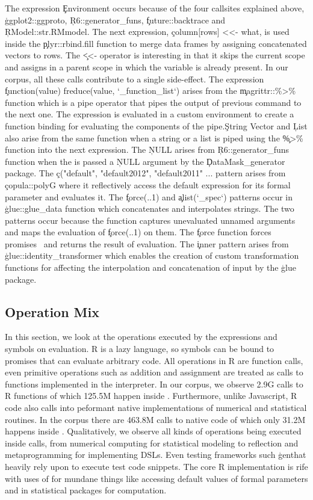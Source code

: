 \documentclass[conference]{IEEEtran}
\begin{document}
The expression \c{Environment} occurs because of the four callsites explained
above, \c{ggplot2::ggproto}, \c{R6::generator_funs}, \c{future::backtrace} and
\c{RModel::str.RMmodel}. The next expression, \c{column[rows] <<- what}, is used
inside the \c{plyr::rbind.fill} function to merge data frames by assigning
concatenated vectors to rows. The \c{<<-} operator is interesting in that it
skips the current scope and assigns in a parent scope in which the variable is
already present. In our corpus, all these \eval calls contribute to a single
side-effect. The expression \c{function(value) freduce(value, `_function_list`)}
arises from the \c{magrittr::\%>\%} function which is a pipe operator that pipes
the output of previous command to the next one. The expression is evaluated in a
custom environment to create a function binding for evaluating the components of
the pipe.\c{String Vector} and \c{List} also arise from the same function when a
string or a list is piped using the \c{\%>\%} function into the next expression.
The \c{NULL} arises from \c{R6::generator_funs} function when the \eval is
passed a \c{NULL} argument by the \c{DataMask_generator} package. The
\c{c("default", "default2012", "default2011" ...} pattern arises from
\c{copula::polyG} where it reflectively access the default expression for its
formal parameter and evaluates it. The \c{force(..1)} and \c{alist(`_spec`)}
patterns occur in \c{glue::glue_data} function which concatenates and
interpolates strings. The two patterns occur because the function captures
unevaluated unnamed arguments and maps the evaluation of \c{force(..1)} on them.
The \c{force} function forces promises~\cite{oopsla19a} and returns the result
of evaluation. The \c{inner} pattern arises from \c{glue::identity_transformer}
which enables the creation of custom transformation functions for affecting the
interpolation and concatenation of input by the \c{glue} package.

\subsection{Operation Mix}
In this section, we look at the operations executed by the expressions and
symbols on evaluation. R is a lazy language, so symbols can be bound to promises
that can evaluate arbitrary code. All operations in R are function calls, even
primitive operations such as addition and assignment are treated as calls to
functions implemented in the interpreter. In our corpus, we observe 2.9G calls
to R functions of which 125.5M happen inside \eval. Furthermore, unlike
Javascript, R code also calls into peformant native implementations of numerical
and statistical routines. In the corpus there are 463.8M calls to native code of
which only 31.2M happens inside \eval.
Qualitatively, we observe all kinds of operations being executed inside \eval
calls, from numerical computing for statistical modeling to reflection and
metaprogramming for implementing DSLs. Even testing frameworks such \c{genthat}
heavily rely upon \eval to execute test code snippets. The core R implementation
is rife with uses of \eval for mundane things like accessing default values of
formal parameters and in statistical packages for computation.
\end{document}
